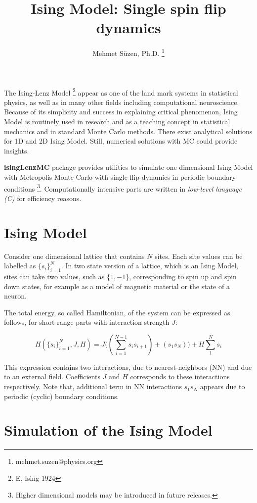 \documentclass[a4paper]{article}
\title{Ising Model: Single spin flip dynamics}
\author{Mehmet S\"uzen, Ph.D. \footnote{mehmet.suzen@physics.org}}
\begin{document}
\maketitle

The Ising-Lenz Model \footnote{E. Ising 1924} appear as one of the land mark systems in statistical physics,
as well as in many other fields including computational neuroscience. Because of its simplicity and success
in explaining critical phenomenon, Ising Model is routinely used in research and as a teaching concept in
statistical mechanics and in standard Monte Carlo methods. There exist analytical solutions for 1D and 2D
Ising Model. Still, numerical solutions with MC could provide insights.

{\bf isingLenzMC} package provides utilities to simulate one dimensional Ising Model with Metropolis Monte 
Carlo with single flip dynamics in periodic boundary conditions \footnote{Higher dimensional models may be 
introduced in future releases.}. Computationally intensive parts are written in {\it low-level language (C)} 
for efficiency reasons.

\section{Ising Model}

Consider one dimensional lattice that contains $N$ sites. Each site values can be labelled as $\{s_{i}\}_{i=1}^{N}$. 
In two state version of a lattice, which is an Ising Model, sites can take two values, such as $\{1,-1\}$,
corresponding to spin up and spin down states, for example as a model of magnetic material or the state of a 
neuron.

The total energy, so called Hamiltonian, of the system can be expressed as follows, for short-range parts with 
interaction strength $J$:

$$ H(\{s_{i}\}_{i=1}^{N}, J, H) = J \big( (\sum_{i=1}^{N-1} s_{i} s_{i+1}) + (s_{1} s_{N}) \big) + H \sum_{1}^{N} s_{i} $$ 

This expression contains two interactions, due to nearest-neighbors (NN) and due to an external field. Coefficients 
$J$ and $H$ corresponds to these interactions respectively. Note that, additional term in NN interactions $s_{1} s_{N}$
appears due to periodic (cyclic) boundary conditions.


\section{Simulation of the Ising Model}
\end{document}
